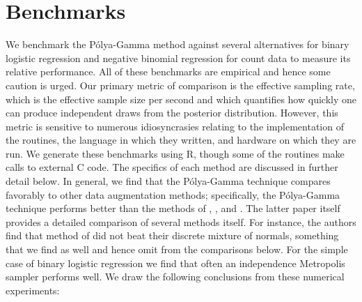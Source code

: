 \documentclass[11pt]{article}
\newcommand{\Polya}{P\'{o}lya}
\begin{document}
\section{Benchmarks}

We benchmark the \Polya-Gamma method against several alternatives for binary
logistic regression and negative binomial regression for count data to measure
its relative performance.  All of these benchmarks are empirical and hence some
caution is urged.  Our primary metric of comparison is the effective sampling
rate, which is the effective sample size per second and which quantifies how
quickly one can produce independent draws from the posterior distribution.
However, this metric is sensitive to numerous idiosyncrasies relating to the
implementation of the routines, the language in which they written, and hardware
on which they are run.  We generate these benchmarks using R, though some of the
routines make calls to external C code.  The specifics of each method are
discussed in further detail below.  In general, we find that the \Polya-Gamma
technique compares favorably to other data augmentation methods; specifically,
the \Polya-Gamma technique performs better than the methods of
\cite{obrien-dunson-2004}, \cite{gramacy-polson-2012}, and
\cite{fruhwirth-schnatter-fruhwirth-2010}.  The latter paper itself provides a
detailed comparison of several methods itself.  For instance, the authors find
that method of \cite{holmes-held-2006} did not beat their discrete mixture of
normals, something that we find as well and hence omit from the comparisons
below.  For the simple case of binary logistic regression we find that often an
independence Metropolis sampler performs well.  We draw the following
conclusions from these numerical experiments:
\end{document}
